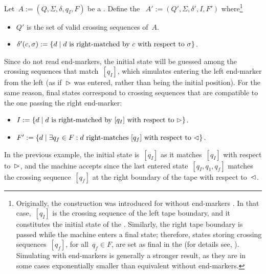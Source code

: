 Let~$A:=(Q,\Sigma,\delta,q_I,F)$ be a \TDFA.
Define the \ONFA~$A':=(Q',\Sigma,\delta',I,F')$ where\footnote{%
	Originally, the construction was introduced for \TDFAs without end-markers \cite{RabSco59}.
	In that case,~$[q_I]$ is the crossing sequence of the left tape boundary, and it constitutes the initial state of the \ONFA.
	Similarly, the right tape boundary is passed while the machine enters a final state; therefore, states storing crossing sequences~$[q_f]$, for all~$q_f\in F$, are set as final in the \ONFA (for details see, \eg[,] \cite{HopUll79}).
	Simulating \TDFAs with end-markers is generally a stronger result, as they are in some cases exponentially smaller than equivalent \TDFAs without end-markers.
}
\begin{itemize}
	\item $Q'$ is the set of valid crossing sequences of~$A$.
	\item $\delta'(c,\sigma):=\{d \mid \text{$d$ is right-matched by~$c$ with respect to~$\sigma$}\}$.
\end{itemize}
Since \ONFAs do not read end-markers, the initial state will be guessed among the crossing sequences that match~$[q_I]$, which simulates entering the left end-marker from the left (as if~$\rhd$ was entered, rather than being the initial position).
For the same reason, final states correspond to crossing sequences that are compatible to the one passing the right end-marker:
\begin{itemize}
	\item $I:=\{d\mid \text{$d$ is right-matched by~$[q_I]$ with respect to~$\rhd$}\}$.
	\item $F':=\{d\mid \exists q_f\in F: \text{$d$ right-matches~$[q_f]$ with respect to~$\lhd$}\}$.
\end{itemize}
In the previous example, the initial state is~$[q_I]$ as it matches~$[q_I]$ with respect to~$\rhd$, and the machine accepts since the last entered state~$[q_I,q_1,q_f]$ matches the crossing sequence~$[q_f]$ at the right boundary of the tape with respect to~$\lhd$.

